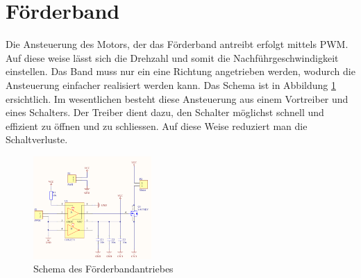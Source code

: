 \section{Förderband}
\label{sec:Foerderband}
    Die Ansteuerung des Motors, der das Förderband antreibt erfolgt mittels PWM. Auf diese 
    weise lässt sich die Drehzahl und somit die Nachführgeschwindigkeit einstellen. Das 
    Band muss nur ein eine Richtung angetrieben werden, wodurch die Ansteuerung einfacher 
    realisiert werden kann. Das Schema ist in Abbildung \ref{abb:SchemaAnsteuerung} 
    ersichtlich. Im wesentlichen besteht diese Ansteuerung aus einem Vortreiber und eines 
    Schalters. Der Treiber dient dazu, den Schalter möglichst schnell und effizient zu 
    öffnen und zu schliessen. Auf diese Weise reduziert man die Schaltverluste. 
    \begin{figure}[h!]
    	\includegraphics[width=0.4\textwidth,clip,trim=0mm 0mm 0mm 0mm]
    	{Enddokumentation/Bilder/Schema_DC-Ansteuerung.png}
    	\centering
    	\caption{Schema des Förderbandantriebes}
    	\label{abb:SchemaAnsteuerung}
    \end{figure}